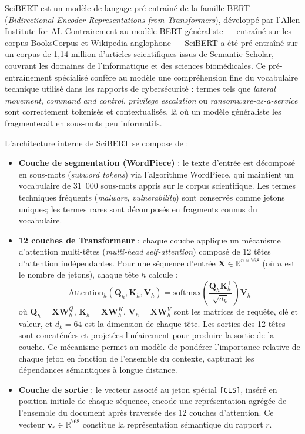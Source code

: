 SciBERT est un modèle de langage pré-entraîné de la famille BERT (\textit{Bidirectional Encoder Representations from Transformers}), développé par l'Allen Institute for AI. Contrairement au modèle BERT généraliste --- entraîné sur les corpus BooksCorpus et Wikipedia anglophone --- SciBERT a été pré-entraîné sur un corpus de 1{,}14 million d'articles scientifiques issus de Semantic Scholar, couvrant les domaines de l'informatique et des sciences biomédicales. Ce pré-entraînement spécialisé confère au modèle une compréhension fine du vocabulaire technique utilisé dans les rapports de cybersécurité : termes tels que \textit{lateral movement}, \textit{command and control}, \textit{privilege escalation} ou \textit{ransomware-as-a-service} sont correctement tokenisés et contextualisés, là où un modèle généraliste les fragmenterait en sous-mots peu informatifs.

L'architecture interne de SciBERT se compose de :
\begin{itemize}
    \item \textbf{Couche de segmentation (WordPiece)} : le texte d'entrée est décomposé en sous-mots (\textit{subword tokens}) via l'algorithme WordPiece, qui maintient un vocabulaire de 31~000 sous-mots appris sur le corpus scientifique. Les termes techniques fréquents (\textit{malware}, \textit{vulnerability}) sont conservés comme jetons uniques; les termes rares sont décomposés en fragments connus du vocabulaire.
    \item \textbf{12 couches de Transformeur} : chaque couche applique un mécanisme d'attention multi-têtes (\textit{multi-head self-attention}) composé de 12 têtes d'attention indépendantes. Pour une séquence d'entrée $\mathbf{X} \in \mathbb{R}^{n \times 768}$ (où $n$ est le nombre de jetons), chaque tête $h$ calcule :
    \[
    \text{Attention}_h(\mathbf{Q}_h, \mathbf{K}_h, \mathbf{V}_h) = \text{softmax}\!\left(\frac{\mathbf{Q}_h \mathbf{K}_h^\top}{\sqrt{d_k}}\right) \mathbf{V}_h
    \]
    où $\mathbf{Q}_h = \mathbf{X}\mathbf{W}_h^Q$, $\mathbf{K}_h = \mathbf{X}\mathbf{W}_h^K$, $\mathbf{V}_h = \mathbf{X}\mathbf{W}_h^V$ sont les matrices de requête, clé et valeur, et $d_k = 64$ est la dimension de chaque tête. Les sorties des 12 têtes sont concaténées et projetées linéairement pour produire la sortie de la couche. Ce mécanisme permet au modèle de pondérer l'importance relative de chaque jeton en fonction de l'ensemble du contexte, capturant les dépendances sémantiques à longue distance.
    \item \textbf{Couche de sortie} : le vecteur associé au jeton spécial \texttt{[CLS]}, inséré en position initiale de chaque séquence, encode une représentation agrégée de l'ensemble du document après traversée des 12 couches d'attention. Ce vecteur $\mathbf{v}_r \in \mathbb{R}^{768}$ constitue la représentation sémantique du rapport $r$.
\end{itemize}

